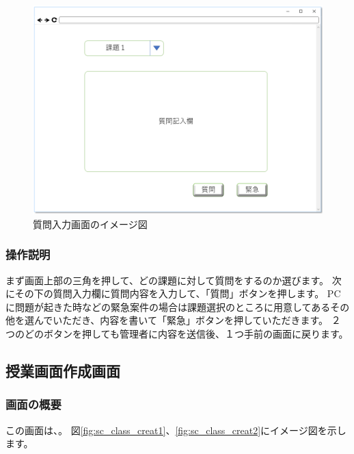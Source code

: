 \begin{figure}[htbp]
\begin{center}
  \includegraphics[width=1\linewidth,clip]{./img/sc_input_q.png}
  \caption{質問入力画面のイメージ図}\label{fig:sc_input_q}
\end{center}
\end{figure}

\subsubsection{操作説明}
まず画面上部の三角を押して、どの課題に対して質問をするのか選びます。
次にその下の質問入力欄に質問内容を入力して、「質問」ボタンを押します。
PCに問題が起きた時などの緊急案件の場合は課題選択のところに用意してあるその他を選んでいただき、内容を書いて「緊急」ボタンを押していただきます。
２つのどのボタンを押しても管理者に内容を送信後、１つ手前の画面に戻ります。

\subsection{授業画面作成画面}
\subsubsection{画面の概要}
この画面は、。
図\ref{fig:sc_class_creat1}、\ref{fig:sc_class_creat2}にイメージ図を示します。

